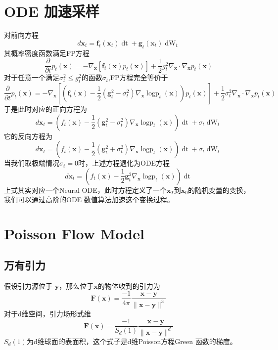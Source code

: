 \documentclass{article}
\newcommand{\tmmathbf}[1]{\ensuremath{\boldsymbol{#1}}}
\newcommand{\tmop}[1]{\ensuremath{\operatorname{#1}}}
\begin{document}
\begin{CJK*}{UTF8}{gbsn}
\section{ODE 加速采样}

对前向方程
\[ d\tmmathbf{x}_t =\tmmathbf{f}_t (\tmmathbf{x}_t) \tmop{dt} +\tmmathbf{g}_t
   (\tmmathbf{x}_t) \tmop{dW}_t \]
其概率密度函数满足FP方程
\[ \frac{\partial}{\partial t} p_t (\tmmathbf{x}) = - \nabla_{\tmmathbf{x}}
   [\tmmathbf{f}_t (\tmmathbf{x}) p_t (\tmmathbf{x})] + \frac{1}{2} g_t^2
   \nabla_{\tmmathbf{x}} \cdot \nabla_{\tmmathbf{x}} p_t (\tmmathbf{x}) \]
对于任意一个满足$\sigma_t^2 \leqslant
g_t^2$的函数$\sigma_t$,FP方程完全等价于
\[ \frac{\partial}{\partial t} p_t (\tmmathbf{x}) = - \nabla_{\tmmathbf{x}}
   \left[ \left( \tmmathbf{f}_t (\tmmathbf{x}) - \frac{1}{2} (\tmmathbf{g}_t^2
   - \sigma_t^2) \nabla_{\tmmathbf{x}} \tmop{logp}_t (\tmmathbf{x}) \right)
   p_t (\tmmathbf{x}) \right] + \frac{1}{2} \sigma_t^2 \nabla_{\tmmathbf{x}}
   \cdot \nabla_{\tmmathbf{x}} p_t (\tmmathbf{x}) \]
于是此时对应的正向方程为
\[ d\tmmathbf{x}_t = \left( f_t (\tmmathbf{x}) - \frac{1}{2} (\tmmathbf{g}_t^2
   - \sigma_t^2) \nabla_{\tmmathbf{x}} \tmop{logp}_t (\tmmathbf{x}) \right)
   \tmop{dt} + \sigma_t \tmop{dW}_t \]
它的反向方程为
\[ d\tmmathbf{x}_t = \left( f_t (\tmmathbf{x}) - \frac{1}{2} (\tmmathbf{g}_t^2
   + \sigma_t^2) \nabla_{\tmmathbf{x}} \tmop{logp}_t (\tmmathbf{x}) \right)
   \tmop{dt} + \sigma_t \tmop{dW}_t \]
当我们取极端情况$\sigma_t = 0$时，上述方程退化为ODE方程
\[ d\tmmathbf{x}_t = \left( f_t (\tmmathbf{x}) - \frac{1}{2} \tmmathbf{g}_t^2
   \nabla_{\tmmathbf{x}} \tmop{logp}_t (\tmmathbf{x}) \right) \tmop{dt} \]
上式其实对应一个Neural
ODE，此时方程定义了一个$\tmmathbf{x}_T$到$\tmmathbf{x}_0$的随机变量的变换，我们可以通过高阶的ODE
数值算法加速这个变换过程。

\section{Poisson Flow Model}

\subsection{万有引力}

假设引力源位于
$\tmmathbf{y}$，那么位于$\tmmathbf{x}$的物体收到的引力为
\[ \tmmathbf{F} (\tmmathbf{x}) = \frac{- 1}{4 \pi}
   \frac{\tmmathbf{x}-\tmmathbf{y}}{\| \tmmathbf{x}-\tmmathbf{y} \|^3} \]
对于d维空间，引力场形式维
\[ \tmmathbf{F} (\tmmathbf{x}) = \frac{- 1}{S_d (1)}
   \frac{\tmmathbf{x}-\tmmathbf{y}}{\| \tmmathbf{x}-\tmmathbf{y} \|^d} \]
$S_d (1)$为d维球面的表面积，这个式子是d维Poisson方程Green
函数的梯度。


\end{CJK*}
\end{document}
